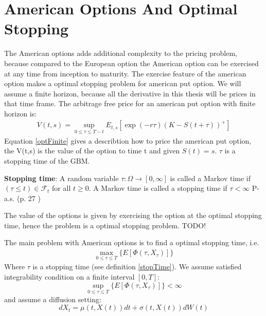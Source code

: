 
\section{American Options And Optimal Stopping}\label{AmericanOptions}
The American options adds additional complexity to the pricing problem, because compared to the European option the American option can be exercised at any time from inception to maturity. The exercise feature of the american option makes a optimal stopping problem for american put option. We will assume a finite horizon, because all the derivative in this thesis will be prices in that time frame. The arbitrage free price for an american put option with finite horizon is:
\begin{align}\label{optFinite}
V(t,s)=\sup_{0\leq \tau \leq T-t} E_{t,s}[\exp(-r \tau) (K-S(t+\tau))^+]
\end{align}
Equation \ref{optFinite} gives a describtion how to price the american put option, the V(t,s) is the value of the option to time t and given $S(t)=s$. $\tau$ is a stopping time of the GBM.
\theoremstyle{definition}\label{StoppingTime}
\begin{definition}{\textbf{Stopping time}:}
A random variable $\tau:\Omega \to [0,\infty]$ is called a Markov time if $(\tau \leq t)\in \mathcal{F}_{t}$ for all $t\geq 0$. A Markov time is called a stopping time if $\tau<\infty$ P-a.s.
(p. 27 \parencite{Shiryaev06})
\end{definition}
The value of the options is given by exercising the option at the optimal stopping time, hence the problem is a optimal stopping problem. 
TODO!


The main problem with American options is to find a optimal stopping time, i.e.
\begin{align}
\max_{0 \leq \tau\leq T}\{E[\Phi(\tau,X_{\tau})]\}
\end{align}
Where $\tau$ is a stopping time (see definition \ref{stopTime}).
We assume satisfied integrability condition on a finite interval $[0,T]$:
$$\sup_{0 \leq \tau\leq T}\{E[\Phi(\tau,X_\tau)]\}<\infty$$
and assume a diffusion setting:
$$dX_t=\mu(t,X(t))dt + \sigma(t,X(t))dW(t)$$

